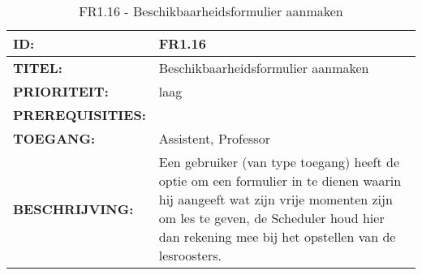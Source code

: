         
\noindent\begin{table}[H]
            \begin{tabular}{l | p{10cm}}
                \textbf{ID:} & FR1.16 \\ \hline
                \textbf{TITEL:} & Beschikbaarheidsformulier aanmaken\\ \hline
                \textbf{PRIORITEIT:} &  laag \\ \hline
                \textbf{PREREQUISITIES:} & \\ \hline
                \textbf{TOEGANG:} & Assistent, Professor \\ \hline
                \textbf{BESCHRIJVING:} & Een gebruiker (van type toegang) heeft de optie om een formulier in te dienen waarin hij aangeeft wat zijn vrije momenten zijn om les te geven, de Scheduler houd hier dan rekening mee bij het opstellen van de lesroosters.\\ 
            \end{tabular}\\
            \caption{FR1.16 - Beschikbaarheidsformulier aanmaken}
            \label{tab:FR1.16 - Beschikbaarheidsformulier aanmaken}
        \end{table}


        
\clearpage
